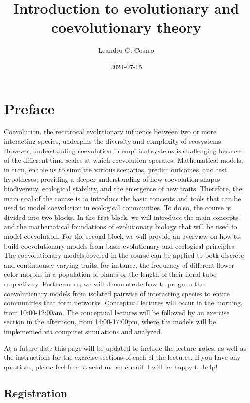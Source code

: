 \documentclass[
]{book}
\title{Introduction to evolutionary and coevolutionary theory}
\author{Leandro G. Cosmo}
\date{2024-07-15}
\begin{document}
\maketitle

{
\setcounter{tocdepth}{1}
\tableofcontents
}
\hypertarget{preface}{%
\chapter{Preface}\label{preface}}

Coevolution, the reciprocal evolutionary influence between two or more interacting species, underpins the diversity and complexity of ecosystems. However, understanding coevolution in empirical systems is challenging because of the different time scales at which coevolution operates. Mathematical models, in turn, enable us to simulate various scenarios, predict outcomes, and test hypotheses, providing a deeper understanding of how coevolution shapes biodiversity, ecological stability, and the emergence of new traits. Therefore, the main goal of the course is to introduce the basic concepts and tools that can be used to model coevolution in ecological communities. To do so, the course is divided into two blocks. In the first block, we will introduce the main concepts and the mathematical foundations of evolutionary biology that will be used to model coevolution. For the second block we will provide an overview on how to build coevolutionary models from basic evolutionary and ecological principles. The coevolutionary models covered in the course can be applied to both discrete and continuously varying traits, for instance, the frequency of different flower color morphs in a population of plants or the length of their floral tube, respectively. Furthermore, we will demonstrate how to progress the coevolutionary models from isolated pairwise of interacting species to entire communities that form networks. Conceptual lectures will occur in the morning, from 10:00-12:00am. The conceptual lectures will be followed by an exercise section in the afternoon, from 14:00-17:00pm, where the models will be implemented via computer simulations and analyzed.

At a future date this page will be updated to include the lecture notes, as well as the instructions for the exercise sections of each of the lectures. If you have any questions, please feel free to send me an e-mail. I will be happy to help!

\hypertarget{registration}{%
\section{Registration}\label{registration}}
\end{document}
